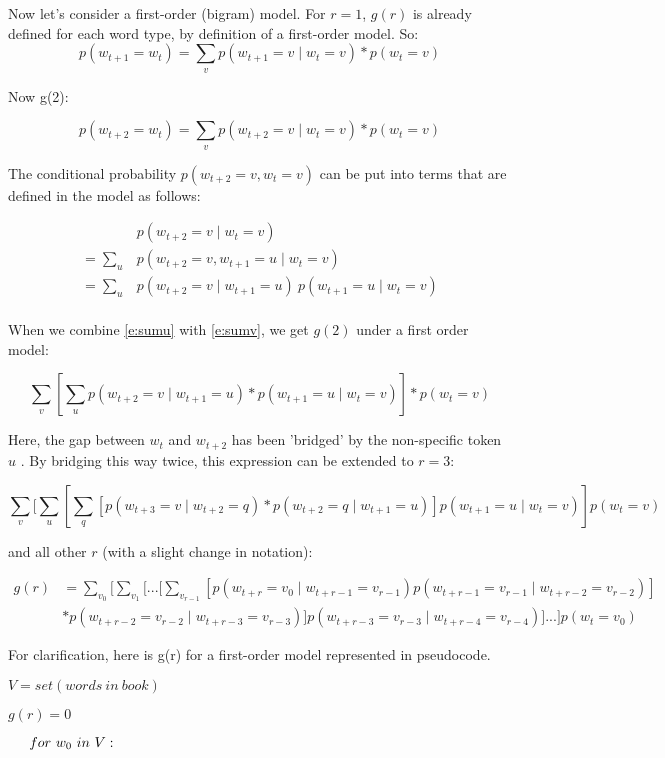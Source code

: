 \documentclass[11pt,letterpaper]{article}
\theoremstyle{definition}
\begin{document}
Now let's consider a first-order (bigram) model. For $r=1$, $g(r)$ is already defined for each word type, by definition of a first-order model. So:
\[p(w_{t+1} = w_{t}) =  \sum_v p(w_{t+1} = v \mid w_{t} = v) * p(w_{t} = v) \]

Now g(2):

\[p(w_{t+2} = w_{t}) =  \sum_v p(w_{t+2} = v \mid w_{t} = v) * p(w_{t} = v) \label{e:sumv} \]

 The conditional probability $p(w_{t+2} = v , w_{t} = v)$ can be put into terms that are defined in the model as follows:

\begin{align}
&p(w_{t+2} = v  \mid w_{t} = v)\\
= \sum_u &p(w_{t+2} = v , w_{t+1} = u \mid w_{t} = v)\\
= \sum_u &p(w_{t+2} = v \mid w_{t+1} = u ) \ p(w_{t+1} = u \mid w_{t} = v) \label{e:sumu} \\
\end{align}

When we combine \ref{e:sumu} with \ref{e:sumv}, we get $g(2)$ under a first order model:


\[ \sum_v [\sum_u p(w_{t+2} = v \mid w_{t+1} = u ) * p(w_{t+1} = u \mid w_{t} = v)] * p(w_{t} = v) \]

Here, the gap between $w_t$ and $w_{t+2}$ has been 'bridged' by the non-specific token $u$ . By bridging this way twice, this expression can be extended to $r = 3$:


\[ \sum_v [\sum_u [\sum_q [p(w_{t+3} = v \mid w_{t+2} = q ) * p(w_{t+2} = q \mid w_{t+1} = u)] p(w_{t+1} = u \mid w_{t} = v) ] p(w_{t} = v) \]

and all other $r$ (with a slight change in notation):

\begin{align} g(r) &= \sum_{v_0}[ \sum_{v_1} [ ... [ \sum_{v_{r-1}} [ p(w_{t+r} = v_0 \mid w_{t+r-1} = v_{r-1}) p(w_{t+r-1} = v_{r-1} \mid w_{t+r-2} = v_{r-2})] \\
& * p(w_{t+r-2} = v_{r-2} \mid w_{t+r-3} = v_{r-3})] p(w_{t+r-3} = v_{r-3} \mid w_{t+r-4} = v_{r-4})] ... ] p(w_t = v_0) 
\end{align}

For clarification, here is g(r) for a first-order model represented in pseudocode.

$V = set(words\ in\ book)$

$g(r) = 0$  

$\indent for\ w_0\ in\ V:$
\end{document}
